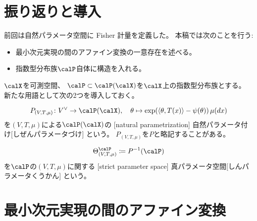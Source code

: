 \documentclass[report]{jlreq}
\begin{document}
%

%
\section*{振り返りと導入}

前回は自然パラメータ空間に Fisher 計量を定義した。
本稿では次のことを行う:
\begin{itemize}
    \item 最小次元実現の間のアファイン変換の一意存在を述べる。
    \item 指数型分布族$\calP$自体に構造を入れる。
\end{itemize}

$\calX$を可測空間、
$\calP \subset \calP(\calX)$を$\calX$上の指数型分布族とする。
新たな用語として次の2つを導入しておく。

\begin{definition}[自然パラメータ付け]
    \begin{equation}
        P_{(V, T, \mu)} \colon V^\vee \to \calP(\calX),
            \quad
            \theta
            \mapsto
            \exp (\myangle{\theta}{T(x)} - \psi(\theta)) \, \mu(dx)
    \end{equation}
    を$(V, T, \mu)$による$\calP(\calX)$の
    [natural parametrization]
        {自然パラメータ付け}[しぜんパラメータづけ]
    という。
    $P_{(V, T, \mu)}$を$P$と略記することがある。
\end{definition}

\begin{definition}[真パラメータ空間]
    \begin{equation}
        \Theta^\calP_{(V, T, \mu)}
            \coloneqq P^{-1}(\calP)
    \end{equation}
    を$\calP$の$(V, T, \mu)$に関する
    [strict parameter space]
        {真パラメータ空間}[しんパラメータくうかん]
    という。
\end{definition}


%
\section{最小次元実現の間のアファイン変換}
\end{document}
